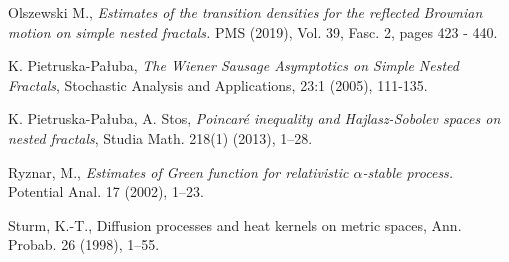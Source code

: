\documentclass[11pt]{article}
\begin{document}
\begin{thebibliography}{99}
 Olszewski M., {\em Estimates of the transition densities for the reflected Brownian motion on simple nested fractals.} PMS (2019), Vol. 39, Fasc. 2,
pages 423 - 440.

K. Pietruska-Pa\l uba, {\em The Wiener Sausage Asymptotics on Simple Nested
Fractals}, Stochastic Analysis and Applications, 23:1 (2005), 111-135.

 K. Pietruska-Pa\l uba, A. Stos, {\em Poincar\'{e} inequality and Hajlasz-Sobolev spaces on nested fractals}, Studia Math. 218(1) (2013), 1--28.


 Ryznar, M., {\em Estimates of Green function for relativistic $\alpha$-stable process.} Potential Anal. 17 (2002),  1--23.

  Sturm,  K.-T., Diffusion processes and heat kernels
 on metric spaces, { Ann. Probab.} { 26} (1998), 1--55.

\end{thebibliography}
\end{document}
